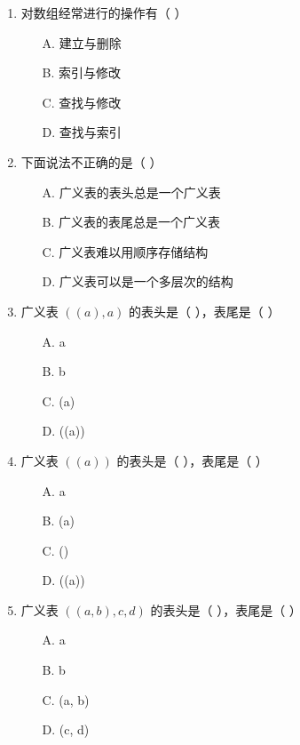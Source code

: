 \documentclass[12pt, a4paper]{article}
\begin{document}
\begin{enumerate}[label=\arabic*.]
	\item 对数组经常进行的操作有（ ）
	      \begin{enumerate}
		      \item[A.] 建立与删除
		      \item[B.] 索引与修改
		      \item[C.] 查找与修改
		      \item[D.] 查找与索引
	      \end{enumerate}

	\item 下面说法不正确的是（ ）
	      \begin{enumerate}
		      \item[A.] 广义表的表头总是一个广义表
		      \item[B.] 广义表的表尾总是一个广义表
		      \item[C.] 广义表难以用顺序存储结构
		      \item[D.] 广义表可以是一个多层次的结构
	      \end{enumerate}

	\item 广义表 $((a), a)$ 的表头是（ ），表尾是（ ）
	      \begin{enumerate}
		      \item[A.] a
		      \item[B.] b
		      \item[C.] (a)
		      \item[D.] ((a))
	      \end{enumerate}

	\item 广义表 $((a))$ 的表头是（ ），表尾是（ ）
	      \begin{enumerate}
		      \item[A.] a
		      \item[B.] (a)
		      \item[C.] ()
		      \item[D.] ((a))
	      \end{enumerate}

	\item 广义表 $((a,b),c,d)$ 的表头是（ ），表尾是（ ）
	      \begin{enumerate}
		      \item[A.] a
		      \item[B.] b
		      \item[C.] (a, b)
		      \item[D.] (c, d)
	      \end{enumerate}


\end{enumerate}
\end{document}
